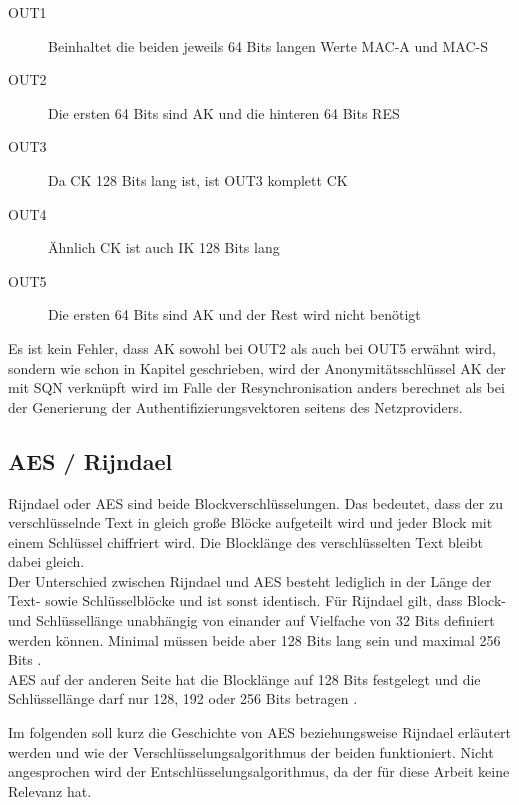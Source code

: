  \begin{description}
  \item [OUT1] Beinhaltet die beiden jeweils 64 Bits langen Werte MAC-A und MAC-S
  \item [OUT2] Die ersten 64 Bits sind AK und die hinteren 64 Bits RES
  \item [OUT3] Da CK 128 Bits lang ist, ist OUT3 komplett CK
  \item [OUT4] Ähnlich CK ist auch IK 128 Bits lang
  \item [OUT5] Die ersten 64 Bits sind AK und der Rest wird nicht benötigt
 \end{description}
 
 Es ist kein Fehler, dass AK sowohl bei OUT2 als auch bei OUT5 erwähnt wird, sondern
 wie schon in Kapitel  geschrieben, wird
 der Anonymitätsschlüssel AK der mit SQN verknüpft wird im Falle der Resynchronisation
 anders berechnet als bei der Generierung der Authentifizierungsvektoren seitens des
 Netzproviders.
 
\subsection{AES / Rijndael}
\label{aes}
 Rijndael oder \ac{AES} sind beide Blockverschlüsselungen. Das bedeutet, dass der zu
 verschlüsselnde Text in gleich große Blöcke aufgeteilt wird und jeder Block mit einem Schlüssel
 chiffriert wird. Die Blocklänge des verschlüsselten Text bleibt dabei gleich. \\
 Der Unterschied zwischen Rijndael und AES besteht lediglich in der Länge der Text- sowie
 Schlüsselblöcke und ist sonst identisch. Für Rijndael gilt, dass Block- und Schlüssellänge
 unabhängig von einander auf Vielfache von 32 Bits definiert werden können. Minimal müssen
 beide aber 128 Bits lang sein und maximal 256 Bits \cite{daemon02}. \\ %
 AES auf der anderen Seite hat die Blocklänge auf 128 Bits festgelegt und die Schlüssel\-länge
 darf nur 128, 192 oder 256 Bits betragen \cite{AES-FIPS}.
 
 Im folgenden soll kurz die Geschichte von AES beziehungsweise Rijndael erläutert werden und
 wie der Verschlüsselungs\-algorithmus der beiden funktioniert. Nicht angesprochen wird der
 Entschlüsselungs\-algorithmus, da der für diese Arbeit keine Relevanz hat.
 
